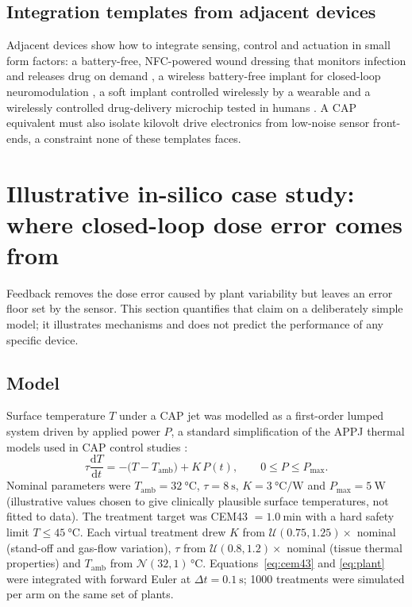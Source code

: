 \documentclass[preprint,review,12pt,authoryear]{elsarticle}
\begin{document}
\subsection{Integration templates from adjacent devices}

Adjacent devices show how to integrate sensing, control and actuation in small form factors: a battery-free, NFC-powered wound dressing that monitors infection and releases drug on demand \citep{xu2021}, a wireless battery-free implant for closed-loop neuromodulation \citep{ouyang2023}, a soft implant controlled wirelessly by a wearable \citep{joo2021} and a wirelessly controlled drug-delivery microchip tested in humans \citep{farra2012}. A CAP equivalent must also isolate kilovolt drive electronics from low-noise sensor front-ends, a constraint none of these templates faces.

\section{Illustrative in-silico case study: where closed-loop dose error comes from}
\label{sec:case}

Feedback removes the dose error caused by plant variability but leaves an error floor set by the sensor. This section quantifies that claim on a deliberately simple model; it illustrates mechanisms and does not predict the performance of any specific device.

\subsection{Model}

Surface temperature $T$ under a CAP jet was modelled as a first-order lumped system driven by applied power $P$, a standard simplification of the APPJ thermal models used in CAP control studies \citep{gidon2016}:
\begin{equation}
\tau \frac{\mathrm{d}T}{\mathrm{d}t} = -\bigl(T - T_{\mathrm{amb}}\bigr) + K\,P(t), \qquad 0 \le P \le P_{\max}.
\label{eq:plant}
\end{equation}
Nominal parameters were $T_{\mathrm{amb}} = \SI{32}{\celsius}$, $\tau = \SI{8}{\second}$, $K = \SI{3}{\celsius\per\watt}$ and $P_{\max} = \SI{5}{\watt}$ (illustrative values chosen to give clinically plausible surface temperatures, not fitted to data). The treatment target was CEM43 $= \SI{1.0}{\minute}$ with a hard safety limit $T \le \SI{45}{\celsius}$. Each virtual treatment drew $K$ from $\mathcal{U}(0.75, 1.25)\times$ nominal (stand-off and gas-flow variation), $\tau$ from $\mathcal{U}(0.8, 1.2)\times$ nominal (tissue thermal properties) and $T_{\mathrm{amb}}$ from $\mathcal{N}(32, 1)$\,\si{\celsius}. Equations~\eqref{eq:cem43} and \eqref{eq:plant} were integrated with forward Euler at $\Delta t = \SI{0.1}{\second}$; 1000 treatments were simulated per arm on the same set of plants.
\end{document}
